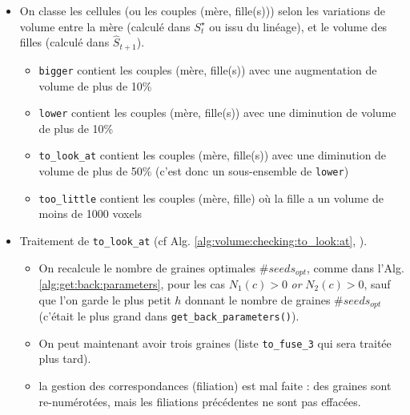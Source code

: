 \documentclass{article}
\begin{document}
\begin{itemize}
\begin{itemize}
\begin{itemize}

\item On classe les cellules (ou les couples (m\`ere, fille(s))) selon les variations de volume entre la m\`ere (calcul\'e dans $S^{\star}_t$ ou issu du lin\'eage), et le volume des filles (calcul\'e dans $\hat{S}_{t+1}$).
\begin{itemize}
\item \verb|bigger| contient les couples (m\`ere, fille(s)) avec une augmentation de volume de plus de 10\%
\item \verb|lower| contient les couples (m\`ere, fille(s)) avec une diminution de volume de plus de 10\%
\item \verb|to_look_at| contient les couples (m\`ere, fille(s)) avec une diminution de volume de plus de 50\% (c'est donc un sous-ensemble de \verb|lower|)
\item \verb|too_little| contient les couples (m\`ere, fille) o\`u la fille a un volume de moins de 1000 voxels
\end{itemize}

\item Traitement de \verb|to_look_at| (cf Alg. \ref{alg:volume:checking:to_look:at}, \cite[point (1), section 2.3.3.6, page 73]{guignard:tel-01278725}).

\begin{itemize}
\item On recalcule le nombre de graines optimales $\# seeds_{opt} $, comme dans l'Alg. \ref{alg:get:back:parameters}, 
pour les cas  $N_1(c) > 0$ \textit{or} $N_2(c) > 0$, sauf que l'on garde le plus petit $h$ donnant le nombre de graines  $\# seeds_{opt} $ (c'\'etait le plus grand dans \texttt{get\_back\_parameters()}).
\item On peut maintenant avoir trois graines (liste \verb|to_fuse_3| qui sera trait\'ee plus tard).
\item la gestion des correspondances (filiation) est mal faite : des graines sont re-num\'erot\'ees, mais les filiations pr\'ec\'edentes ne sont pas effac\'ees.
\end{itemize}


\end{itemize}
\end{itemize}
\end{itemize}
\end{document}
